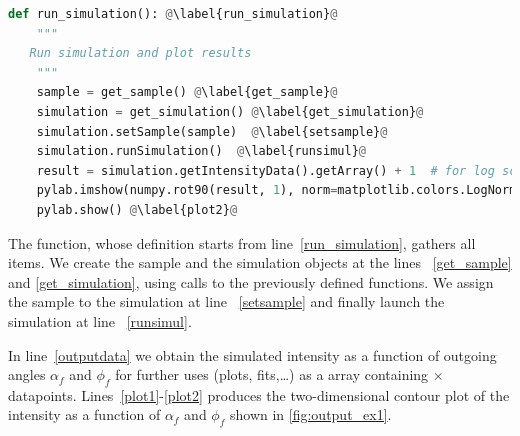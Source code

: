 \begin{lstlisting}[language=python, style=eclipseboxed,name=ex1,nolol]
def run_simulation(): @\label{run_simulation}@
    """
   Run simulation and plot results
    """
    sample = get_sample() @\label{get_sample}@
    simulation = get_simulation() @\label{get_simulation}@
    simulation.setSample(sample)  @\label{setsample}@
    simulation.runSimulation()  @\label{runsimul}@
    result = simulation.getIntensityData().getArray() + 1  # for log scale  @\label{outputdata}@
    pylab.imshow(numpy.rot90(result, 1), norm=matplotlib.colors.LogNorm(), extent=[-1.0, 1.0, 0, 2.0]) @\label{plot1}@
    pylab.show() @\label{plot2}@
\end{lstlisting}
The function, whose definition starts from line~\ref{run_simulation}, gathers all
items. We create the sample and the simulation objects at the lines
~\ref{get_sample} and \ref{get_simulation}, using calls to the previously defined functions. We assign the sample to the simulation at line ~\ref{setsample} and
finally launch the simulation at line ~\ref{runsimul}.

In line~\ref{outputdata} we obtain the simulated intensity
as a function of outgoing angles $\alpha_f$ and $\phi_f$ for further
uses (plots, fits,\ldots) as a  array containing
$\times$
datapoints. Lines~\ref{plot1}-\ref{plot2} produces the two-dimensional
contour plot of the intensity as a function of $\alpha_f$ and
$\phi_f$ shown in \cref{fig:output_ex1}.

